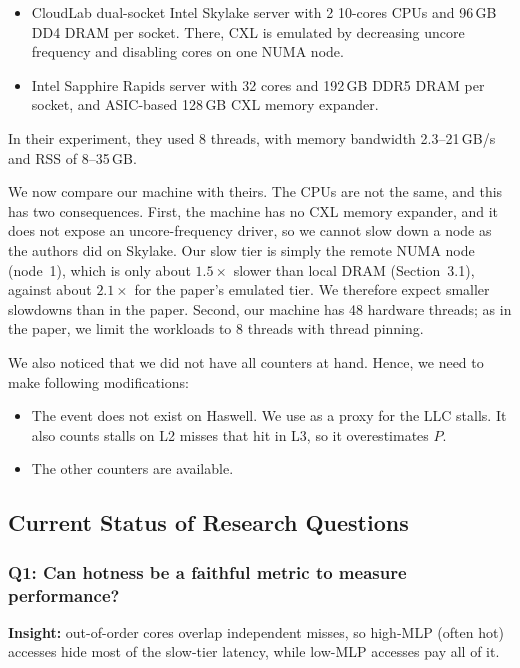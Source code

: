 \documentclass[10pt,a4paper]{article}
\begin{document}
\begin{itemize}
    \item  CloudLab dual-socket Intel Skylake server with 2 10-cores CPUs and 96\,GB DD4 DRAM per socket. There, CXL is emulated by decreasing uncore frequency and disabling cores on one NUMA node. 
    \item Intel Sapphire Rapids server with 32 cores and 192\,GB DDR5 DRAM per socket, and ASIC-based 128\,GB CXL memory expander. 
\end{itemize}

In their experiment, they used 8 threads, with memory bandwidth 2.3--21\,GB/s and RSS of 8--35\,GB. 


 We now compare our machine with theirs. The CPUs are not the same, and this has two consequences. First, the machine has no CXL memory expander, and it does not expose an uncore-frequency driver, so we cannot slow down a node as the authors did on Skylake. Our slow tier is simply the remote NUMA node (node~1), which is only about $1.5\times$ slower than local DRAM (Section~3.1), against about $2.1\times$ for the paper's emulated tier. We therefore expect smaller slowdowns than in the paper. Second, our machine has 48 hardware threads; as in the paper, we limit the workloads to 8 threads with thread pinning.

 We also noticed that we did not have all counters at hand. Hence, we need to make following modifications:

 \begin{itemize}
     \item The event  does not exist on Haswell. We use  as a proxy for the LLC stalls. It also counts stalls on L2 misses that hit in L3, so it overestimates $P$.
     \item The other counters are available.
 \end{itemize}


\subsection{Current Status of Research Questions}

\subsubsection{Q1: Can hotness be a faithful metric to measure performance?}

\textbf{Insight:} out-of-order cores overlap independent misses,
        so high-MLP (often hot) accesses hide most of the slow-tier latency,
        while low-MLP accesses pay all of it.
\end{document}
